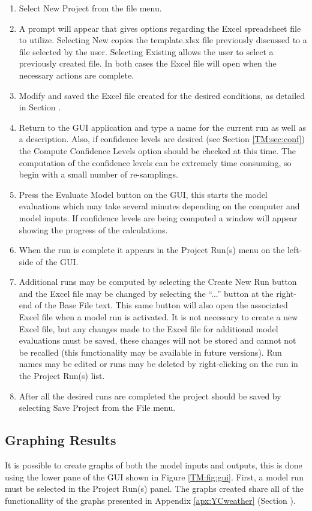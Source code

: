 \begin{enumerate}
\item Select New Project from the file menu.
\item A prompt will appear that gives options regarding the Excel spreadsheet file to utilize.  Selecting New copies the template.xlsx file previously discussed to a file selected by the user.  Selecting Existing allows the user to select a previously created file.  In both cases the Excel file will open when the necessary actions are complete.
\item Modify and saved the Excel file created for the desired conditions, as detailed in Section .
\item Return to the GUI application and type a name for the current run as well as a description. Also, if confidence levels are desired (see Section \ref{TM:sec:conf}) the Compute Confidence Levels option should be checked at this time.  The computation of the confidence levels can be extremely time consuming, so begin with a small number of re-samplings.
\item Press the Evaluate Model button on the GUI, this starts the model evaluations which may take several minutes depending on the computer and model inputs.  If confidence levels are being computed a window will appear showing the progress of the calculations.
\item When the run is complete it appears in the Project Run(s) menu on the left-side of the GUI.
\item Additional runs may be computed by selecting the Create New Run button and the Excel file may be changed by selecting the ``...'' button at the right-end of the Base File text. This same button will also open the associated Excel file when a model run is activated.  It is not necessary to create a new Excel file, but any changes made to the Excel file for additional model evaluations must be saved, these changes will not be stored and cannot not be recalled (this functionality may be available in future versions). Run names may be edited or runs may be deleted by right-clicking on the run in the Project Run(s) list.
\item After all the desired runs are completed the project should be saved by selecting Save Project from the File menu.
\end{enumerate}

\subsection{Graphing Results}
It is possible to create graphs of both the model inputs and outputs, this is done using the lower pane of the GUI shown in Figure \ref{TM:fig:gui}.  First, a model run must be selected in the Project Run(s) panel.  The graphs created share all of the functionallity of the graphs presented in Appendix \ref{apx:YCweather} (Section ).


